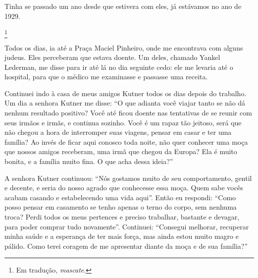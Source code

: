 Tinha se passado um ano desde que estivera com eles, já estávamos no ano de
1929.

\footnote{Em tradução, \textit{mascate}.} 

Todos os dias, ia até a Praça Maciel Pinheiro, onde me encontrava com
alguns judeus. Eles perceberam que estava doente. Um deles,
chamado Yankel Lederman, me disse para ir até lá no dia seguinte cedo: 
ele me levaria até o hospital, para que o médico me examinasse e passasse uma receita.


Continuei indo à casa de meus amigos Kutner todos os dias depois do
trabalho. Um dia a senhora Kutner me disse: ``O que adianta você viajar
tanto se não dá nenhum resultado positivo? Você até ficou doente
nas tentativas de se reunir com seus irmãos e irmãs, e continua
sozinho. Você é um rapaz tão jeitoso, será que não chegou a hora de interromper 
suas viagens, pensar em casar e ter uma família? Ao invés de ficar
aqui conosco toda noite, não quer conhecer uma moça que nossos amigos
receberam, uma irmã que chegou da Europa? Ela é muito bonita, e a família
muito fina. O que acha dessa ideia?''

A senhora Kutner continuou: ``Nós gostamos muito de seu comportamento,
gentil e decente, e seria do nosso agrado que conhecesse essa moça.
Quem sabe vocês acabam casando e estabelecendo uma vida aqui''. Então
eu respondi: ``Como posso pensar em casamento se tenho apenas o
terno do corpo, sem nenhuma troca? Perdi todos os
meus pertences e preciso trabalhar, bastante e devagar, para poder comprar tudo novamente''. Continuei: ``Consegui melhorar, recuperar minha saúde e a esperança de ter mais força, mas ainda estou muito magro e
pálido. Como terei coragem de me apresentar diante da moça e de sua
família?''


